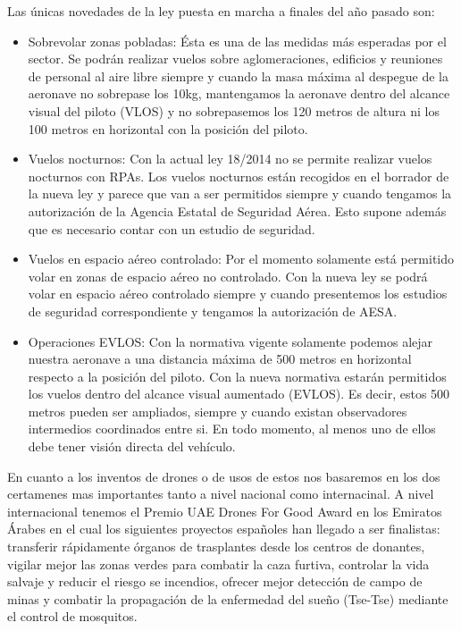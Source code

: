 \begin{itemize}
	\end{itemize}
	
\hspace{-1cm} Las únicas novedades de la ley puesta en marcha a finales del año pasado son:

	\begin{itemize}
		\item Sobrevolar zonas pobladas: Ésta es una de las medidas más esperadas por el sector. Se podrán realizar vuelos sobre aglomeraciones, edificios y reuniones de personal al aire libre siempre y cuando la masa máxima al despegue de la aeronave no sobrepase los 10kg, mantengamos la aeronave dentro del alcance visual del piloto (VLOS) y no sobrepasemos los 120 metros de altura ni los 100 metros en horizontal con la posición del piloto.
		\item Vuelos nocturnos: Con la actual ley 18/2014 no se permite realizar vuelos nocturnos con RPAs. Los vuelos nocturnos están recogidos en el borrador de la nueva ley y parece que van a ser permitidos siempre y cuando tengamos la autorización de la Agencia Estatal de Seguridad Aérea. Esto supone además que es necesario contar con un estudio de seguridad.
		\item Vuelos en espacio aéreo controlado: Por el momento solamente está permitido volar en zonas de espacio aéreo no controlado. Con la nueva ley se podrá volar en espacio aéreo controlado siempre y cuando presentemos los estudios de seguridad correspondiente y tengamos la autorización de AESA.
		\item Operaciones EVLOS: Con la normativa vigente solamente podemos alejar nuestra aeronave a una distancia máxima de 500 metros en horizontal respecto a la posición del piloto. Con la nueva normativa estarán permitidos los vuelos dentro del alcance visual aumentado (EVLOS). Es decir, estos 500 metros pueden ser ampliados, siempre y cuando existan observadores intermedios coordinados entre si. En todo momento, al menos uno de ellos debe tener visión directa del vehículo.
	\end{itemize}	 

\hspace{1cm} En cuanto a los inventos de drones o de usos de estos nos basaremos en los dos certamenes mas importantes tanto a nivel nacional como internacinal. A nivel internacional tenemos el Premio UAE Drones For Good Award en los Emiratos Árabes en el cual los siguientes proyectos españoles han llegado a ser finalistas: transferir rápidamente órganos de trasplantes desde los centros de donantes, vigilar mejor las zonas verdes para combatir la caza furtiva, controlar la vida salvaje y reducir el riesgo se incendios, ofrecer mejor detección de campo de minas y combatir la propagación de la enfermedad del sueño (Tse-Tse) mediante el control de mosquitos.

